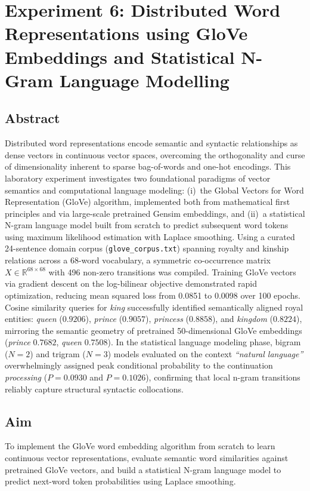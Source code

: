 \chapter{Experiment 6: Distributed Word Representations using GloVe Embeddings and Statistical N-Gram Language Modelling}
\label{chap:exp6}

\section{Abstract}
Distributed word representations encode semantic and syntactic relationships as dense vectors in continuous vector spaces, overcoming the orthogonality and curse of dimensionality inherent to sparse bag-of-words and one-hot encodings. This laboratory experiment investigates two foundational paradigms of vector semantics and computational language modeling: (i)~the Global Vectors for Word Representation (GloVe) algorithm, implemented both from mathematical first principles and via large-scale pretrained Gensim embeddings, and (ii)~a statistical N-gram language model built from scratch to predict subsequent word tokens using maximum likelihood estimation with Laplace smoothing. Using a curated 24-sentence domain corpus (\texttt{glove\_corpus.txt}) spanning royalty and kinship relations across a 68-word vocabulary, a symmetric co-occurrence matrix $X \in \mathbb{R}^{68 \times 68}$ with 496 non-zero transitions was compiled. Training GloVe vectors via gradient descent on the log-bilinear objective demonstrated rapid optimization, reducing mean squared loss from 0.0851 to 0.0098 over 100 epochs. Cosine similarity queries for \textit{king} successfully identified semantically aligned royal entities: \textit{queen} ($0.9206$), \textit{prince} ($0.9057$), \textit{princess} ($0.8858$), and \textit{kingdom} ($0.8224$), mirroring the semantic geometry of pretrained 50-dimensional GloVe embeddings (\textit{prince} $0.7682$, \textit{queen} $0.7508$). In the statistical language modeling phase, bigram ($N=2$) and trigram ($N=3$) models evaluated on the context \textit{``natural language''} overwhelmingly assigned peak conditional probability to the continuation \textit{processing} ($P=0.0930$ and $P=0.1026$), confirming that local n-gram transitions reliably capture structural syntactic collocations.

\section{Aim}
To implement the GloVe word embedding algorithm from scratch to learn continuous vector representations, evaluate semantic word similarities against pretrained GloVe vectors, and build a statistical N-gram language model to predict next-word token probabilities using Laplace smoothing.

